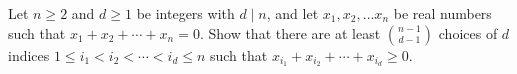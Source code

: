 Let $n\ge 2$ and $d\ge 1$ be integers with $d\mid n$,  and let $x_1,x_2,\ldots x_n$ be real numbers such that $x_1+x_2+\cdots + x_n=0$. Show that there are at least $\binom{n-1}{d-1}$ choices of $d$ indices $1\le i_1<i_2<\cdots <i_d\le n $ such that $x_{i_{1}}+x_{i_{2}}+\cdots +x_{i_{d}}\ge 0$.